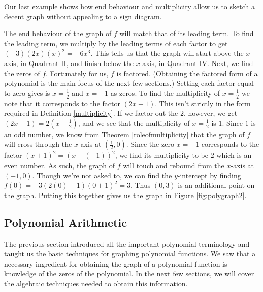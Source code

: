 \smallskip

Our last example shows how end behaviour and multiplicity allow us to sketch a decent graph without appealing to a sign diagram.


\medskip

{
The end behaviour of the graph of $f$ will match that of its leading term.  To find the leading term, we multiply by the leading terms of each factor to get $(-3)(2x)(x)^2 = -6x^3$.  This tells us that the graph will start above the $x$-axis, in Quadrant II, and finish below the $x$-axis, in Quadrant IV.  Next, we find the zeros of $f$.  Fortunately for us, $f$ is factored. (Obtaining the factored form of a polynomial is the main focus of the next few sections.)  Setting each factor equal to zero gives is $x = \frac{1}{2}$ and $x=-1$ as zeros. To find the multiplicity of $x=\frac{1}{2}$ we note that it corresponds to the factor $(2x-1)$.  This isn't strictly in the form required in Definition \ref{multiplicity}.  If we factor out the $2$, however, we get $(2x-1) = 2\left(x-\frac{1}{2}\right)$, and we see that the multiplicity of $x = \frac{1}{2}$ is $1$.  Since $1$ is an odd number, we know from Theorem \ref{roleofmultiplicity} that the graph of $f$ will cross through the $x$-axis at $\left(\frac{1}{2},0\right)$.   Since the zero $x=-1$ corresponds to the factor $(x+1)^2 = (x-(-1))^2$, we find its multiplicity to be $2$ which is an even number.  As such, the graph of $f$ will touch and rebound from the $x$-axis at $(-1,0)$.  Though we're not asked to, we can find the $y$-intercept by finding $f(0) = -3(2(0)-1)(0+1)^2 = 3$.  Thus  $(0,3)$ is an additional point on the graph.  Putting this together gives us the graph in Figure \ref{fig:polygraph2}.

}

\subsection{Polynomial Arithmetic}
\label{PolyArith}


The previous section introduced all the important polynomial terminology and taught us the basic techniques for graphing polynomial functions. We saw that a necessary ingredient for obtaining the graph of a polynomial function is knowledge of the zeros of the polynomial. In the next few sections, we will cover the algebraic techniques needed to obtain this information.

